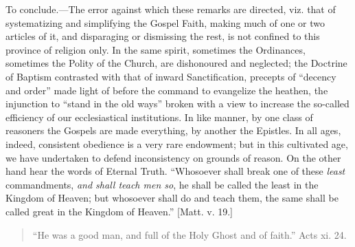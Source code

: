 To conclude.—The error against which these remarks are directed,
viz. that of systematizing and simplifying the Gospel Faith, making much
of one or two articles of it, and disparaging or dismissing the rest, is
not confined to this province of religion only. In the same spirit,
sometimes the Ordinances, sometimes the Polity of the Church, are
dishonoured and neglected; the Doctrine of Baptism contrasted with that
of inward Sanctification, precepts of ``decency and order'' made
light of before the command to evangelize the heathen, the injunction to
``stand in the old ways'' broken with a view to increase the
so-called efficiency of our ecclesiastical institutions. In like manner,
by one class of reasoners the Gospels are made everything, by another
the Epistles. In all ages, indeed, consistent obedience is a very rare
endowment; but in this cultivated age, we have undertaken to defend
inconsistency on grounds of reason. On the other hand hear the words of
Eternal Truth. ``Whosoever shall break one of these \emph{least}
commandments, \emph{and shall teach men so}, he shall be called the
least in the Kingdom of Heaven; but whosoever shall do and teach them,
the same shall be called great in the Kingdom of Heaven.'' [Matt. v.
19.]


\begin{quote}

``He was a good man, and full of the Holy Ghost and of
faith.'' Acts xi. 24.

\end{quote}

